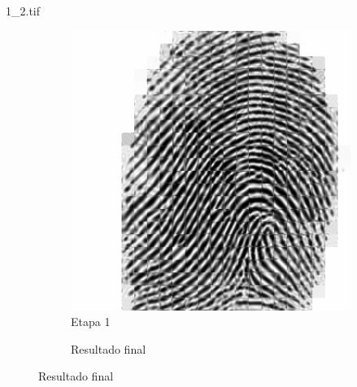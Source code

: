 \documentclass{beamer}
\begin{document}
\begin{frame}{1\_2.tif}
\begin{figure}
\begin{subfigure}[!ht]{0.32\textwidth}
                \includegraphics[width=\columnwidth]{Fingerprints/1_2_intermediate.jpg}
                \caption{Etapa 1}
            \end{subfigure}
            \begin{subfigure}[!ht]{0.32\textwidth}
                \caption{Resultado final}
            \end{subfigure}
        \end{figure}
    \end{frame}
\end{document}
